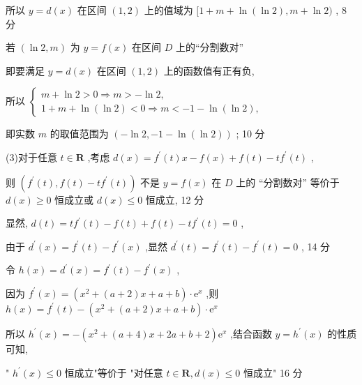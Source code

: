 \documentclass[10pt]{article}
\begin{document}
所以 \(y = d\left( x\right)\) 在区间 \(\left( {1,2}\right)\) 上的值域为 \(\lbrack 1 + m + \ln \left( {\ln 2}\right) ,m + \ln 2)\) , 8 分

若 \(\left( {\ln 2,m}\right)\) 为 \(y = f\left( x\right)\) 在区间 \(D\) 上的“分割数对”

即要满足 \(y = d\left( x\right)\) 在区间 \(\left( {1,2}\right)\) 上的函数值有正有负,

所以 \(\left\{  \begin{array}{l} m + \ln 2 > 0 \Rightarrow  m >  - \ln 2, \\  1 + m + \ln \left( {\ln 2}\right)  < 0 \Rightarrow  m <  - 1 - \ln \left( {\ln 2}\right) , \end{array}\right.\)

即实数 \(m\) 的取值范围为 \(\left( {-\ln 2, - 1 - \ln \left( {\ln 2}\right) }\right)\) ; 10 分

(3)对于任意 \(t \in  \mathbf{R}\) ,考虑 \(d\left( x\right)  = {f}^{\prime }\left( t\right) x - f\left( x\right)  + f\left( t\right)  - t{f}^{\prime }\left( t\right)\) ,

则 \(\left( {{f}^{\prime }\left( t\right) ,f\left( t\right)  - t{f}^{\prime }\left( t\right) }\right)\) 不是 \(y = f\left( x\right)\) 在 \(D\) 上的 “分割数对” 等价于 \(d\left( x\right)  \geq  0\) 恒成立或 \(d\left( x\right)  \leq  0\) 恒成立, 12 分

显然, \(d\left( t\right)  = t{f}^{\prime }\left( t\right)  - f\left( t\right)  + f\left( t\right)  - t{f}^{\prime }\left( t\right)  = 0\) ,

由于 \({d}^{\prime }\left( x\right)  = {f}^{\prime }\left( t\right)  - {f}^{\prime }\left( x\right)\) ,显然 \({d}^{\prime }\left( t\right)  = {f}^{\prime }\left( t\right)  - {f}^{\prime }\left( t\right)  = 0\) , 14 分

令 \(h\left( x\right)  = {d}^{\prime }\left( x\right)  = {f}^{\prime }\left( t\right)  - {f}^{\prime }\left( x\right)\) ,

因为 \({f}^{\prime }\left( x\right)  = \left( {{x}^{2} + \left( {a + 2}\right) x + a + b}\right)  \cdot  {\mathrm{e}}^{x}\) ,则 \(h\left( x\right)  = {f}^{\prime }\left( t\right)  - \left( {{x}^{2} + \left( {a + 2}\right) x + a + b}\right)  \cdot  {\mathrm{e}}^{x}\)

所以 \({h}^{\prime }\left( x\right)  =  - \left( {{x}^{2} + \left( {a + 4}\right) x + {2a} + b + 2}\right) {\mathrm{e}}^{x}\) ,结合函数 \(y = {h}^{\prime }\left( x\right)\) 的性质可知,

" \({h}^{\prime }\left( x\right)  \leq  0\) 恒成立"等价于 "对任意 \(t \in  \mathbf{R},d\left( x\right)  \leq  0\) 恒成立" 16 分
\end{document}
